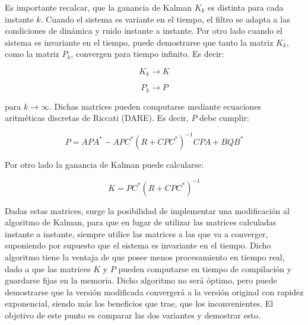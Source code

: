 
	Es importante recalcar, que la ganancia de Kalman $K_k$ es distinta para cada instante $k$. Cuando el sistema es variante en el tiempo, el filtro se adapta a las condiciones de dinámica y ruido instante a instante. Por otro lado cuando el sistema es invariante en el tiempo, puede demostrarse que tanto la matriz $K_k$, como la matriz $P_k$, convergen para tiempo infinito. Es decir:
	
	\begin{equation*}
		K_k \longrightarrow K
	\end{equation*}
	
	\begin{equation*}
		P_k \longrightarrow P
	\end{equation*}
	
	para $k \rightarrow \infty$. Dichas matrices pueden computarse mediante ecuaciones aritméticas discretas de Riccati (DARE). Es decir, $P$ debe cumplir:
	
	\begin{equation*}
		P = A P A^{*} - A P C^{*} (R + C P C^{*})^{-1} C P A + B Q B^{*}
	\end{equation*}
	
	Por otro lado la ganancia de Kalman puede calcularse:
	
	\begin{equation*}
		K = P C^{*} (R + C P C^{*})^{-1}
	\end{equation*}
	
	Dadas estas matrices, surge la posibilidad de implementar una modificación al algoritmo de Kalman, para que en lugar de utilizar las matrices calculadas instante a instante, siempre utilice las matrices a las que va a converger, suponiendo por supuesto que el sistema es invariante en el tiempo. Dicho algoritmo tiene la ventaja de que posee menos procesamiento en tiempo real, dado a que las matrices $K$ y $P$ pueden computarse en tiempo de compilación y guardarse fijas en la memoria. Dicho algoritmo no será óptimo, pero puede demostrarse que la versión modificada convergerá a la versión original con rapidez exponencial, siendo más los beneficios que trae, que los inconvenientes. El objetivo de este punto es comparar las dos variantes y demostrar esto.

